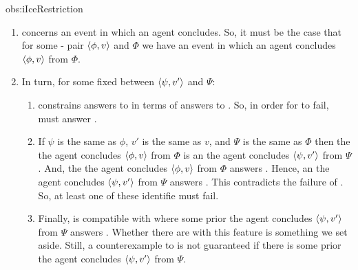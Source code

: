 \begin{note}
\begin{motivation}{obs:iIceRestriction}
    \begin{enumerate}[label=\arabic*., ref=\arabic*]
    \item
      \qWhy{} concerns an event in which an agent concludes.
      So, it must be the case that for some - pair \(\langle\phi, v\rangle\) and \pool{} \(\Phi\) we have an event in which an agent concludes \(\langle\phi, v\rangle\) from \(\Phi\).
    \item
      In turn, for some fixed \fofr{} between \(\langle\psi, v'\rangle\) and \(\Psi\):
      \begin{enumerate}[label=\Alph*., ref=\Alph*]
      \item
        \issueInclusion{} constrains answers to \qWhy{} in terms of answers to \qHow{}.
        So, in order for \issueInclusion{} to fail,  must answer \qWhy{}.
      \item
        If \(\psi\) is the same as \(\phi\), \(v'\) is the same as \(v\), and \(\Psi\) is the same as \(\Phi\) then the  the agent concludes \(\langle\phi, v\rangle\) from \(\Phi\) is an  the agent concludes \(\langle\psi, v'\rangle\) from \(\Psi\).
        And, the  the agent concludes \(\langle\phi, v\rangle\) from \(\Phi\) answers \qHow{}.
        Hence, an  the agent concludes \(\langle\psi, v'\rangle\) from \(\Psi\) answers \qHow{}.
        This contradicts the failure of \issueInclusion{}.
        So, at least one of these identifie must fail.
      \item
        Finally, \qHow{} is compatible with  where some prior  the agent concludes \(\langle\psi, v'\rangle\) from \(\Psi\) answers \qHow{}.
        Whether there are  with this feature is something we set aside.
        Still, a counterexample to \issueInclusion{} is not guaranteed if there is some prior  the agent concludes \(\langle\psi, v'\rangle\) from \(\Psi\).
      \end{enumerate}
    \end{enumerate}
    \vspace{-\baselineskip}
  \end{motivation}
\end{note}


